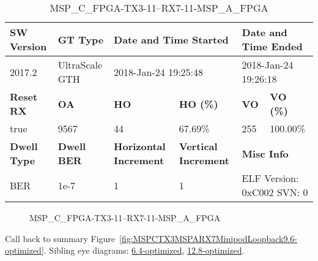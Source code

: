 \begin{table}[h]
\centering
\caption{MSP\_C\_FPGA-TX3-11--RX7-11-MSP\_A\_FPGA}
\label{tab:MSPCFPGATX311RX711MSPAFPGA9.6-optimized}
\begin{tabular}{@{}|l|l|l|l|l|l|@{}}
\toprule
\textbf{SW Version}                & \textbf{GT Type}   & \multicolumn{2}{l|}{\textbf{Date and Time Started}}            & \multicolumn{2}{l|}{\textbf{Date and Time Ended}}        \\ \midrule
2017.2                       & UltraScale GTH          & \multicolumn{2}{l|}{2018-Jan-24 19:25:48}                   & \multicolumn{2}{l|}{2018-Jan-24 19:26:18}               \\ \midrule
\textbf{Reset RX}                  & \textbf{OA} & \textbf{HO}   & \textbf{HO (\%)} & \textbf{VO} & \textbf{VO (\%)} \\ \midrule
true & 9567        & 44          & 67.69\%        & 255        & 100.00\%       \\ \midrule
\textbf{Dwell Type}                & \textbf{Dwell BER} & \textbf{Horizontal Increment} & \textbf{Vertical Increment}    & \multicolumn{2}{l|}{\textbf{Misc Info}}                  \\ \midrule
BER                            & 1e-7        & 1        & 1           & \multicolumn{2}{l|}{ELF Version: 0xC002 SVN: 0}                         \\ \bottomrule
\end{tabular}
\end{table}

\begin{figure}[h]
\caption{MSP\_C\_FPGA-TX3-11--RX7-11-MSP\_A\_FPGA} \label{fig:MSPCFPGATX311RX711MSPAFPGA9.6-optimized}
\end{figure}

Call back to summary Figure~\ref{fig:MSPCTX3MSPARX7MinipodLoopback9.6-optimized}.
Sibling eye diagrams: \hyperref[sec:MSPCFPGATX311RX711MSPAFPGA6.4-optimized]{6.4-optimized}, \hyperref[sec:MSPCFPGATX311RX711MSPAFPGA12.8-optimized]{12.8-optimized}.

\clearpage
\newpage


